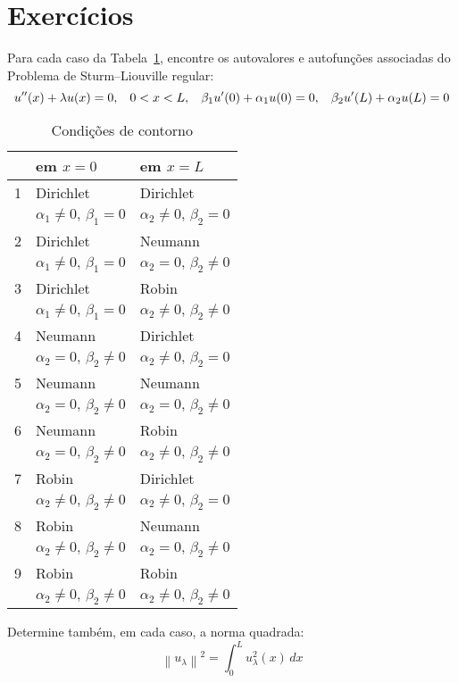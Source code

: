 \documentclass[10pt,a4paper]{article}
\newcommand{\norm}[1]{\left\lVert#1\right\rVert}
\begin{document}
	\section{Exercícios}
	Para cada caso da Tabela~\ref{tbl:1}, encontre os autovalores e autofunções associadas do Problema de Sturm--Liouville regular:
	\[u''(x)+\lambda u(x)=0, \hspace{.3cm} 0<x<L, \hspace{.3cm} \beta_1u'(0)+\alpha_1u(0)=0, \hspace{.3cm}\beta_2u'(L)+\alpha_2 u(L)=0\]
	
\begin{table}[!ht]
\centering
\label{tbl:1}
\begin{tabular}{lll}
 \hline
 & em $x=0$ & em $x=L$\\
 \hline
 1 & Dirichlet & Dirichlet\\
   & $\alpha_1\neq 0,\,\beta_1=0$ & $\alpha_2\neq 0,\,\beta_2=0$\\ 
 2 & Dirichlet & Neumann\\
   & $\alpha_1\neq 0,\,\beta_1=0$ & $\alpha_2=0,\,\beta_2\neq 0$\\ 
 3 & Dirichlet & Robin\\
   & $\alpha_1\neq 0,\,\beta_1=0$ & $\alpha_2\neq 0,\,\beta_2\neq0$\\ 
   
 4 & Neumann & Dirichlet\\
   & $\alpha_2=0,\,\beta_2\neq 0$ & $\alpha_2\neq 0,\,\beta_2=0$\\ 
 5 & Neumann & Neumann\\
   & $\alpha_2=0,\,\beta_2\neq 0$ & $\alpha_2=0,\,\beta_2\neq 0$\\ 
 6 & Neumann & Robin\\
   & $\alpha_2=0,\,\beta_2\neq 0$ & $\alpha_2\neq 0,\,\beta_2\neq0$\\
   
 7 & Robin & Dirichlet\\
   & $\alpha_2\neq 0,\,\beta_2\neq0$ & $\alpha_2\neq 0,\,\beta_2=0$\\ 
 8 & Robin & Neumann\\
   & $\alpha_2\neq 0,\,\beta_2\neq0$ & $\alpha_2=0,\,\beta_2\neq 0$\\ 
 9 & Robin & Robin\\
   & $\alpha_2\neq 0,\,\beta_2\neq0$ & $\alpha_2\neq 0,\,\beta_2\neq0$\\ 
 \hline
\end{tabular}
\caption{Condições de contorno}
\end{table}

Determine também, em cada caso, a norma quadrada:
\[\norm{u_\lambda}^2 = \int_0^L u_\lambda^2(x)\,dx\]
\end{document}
